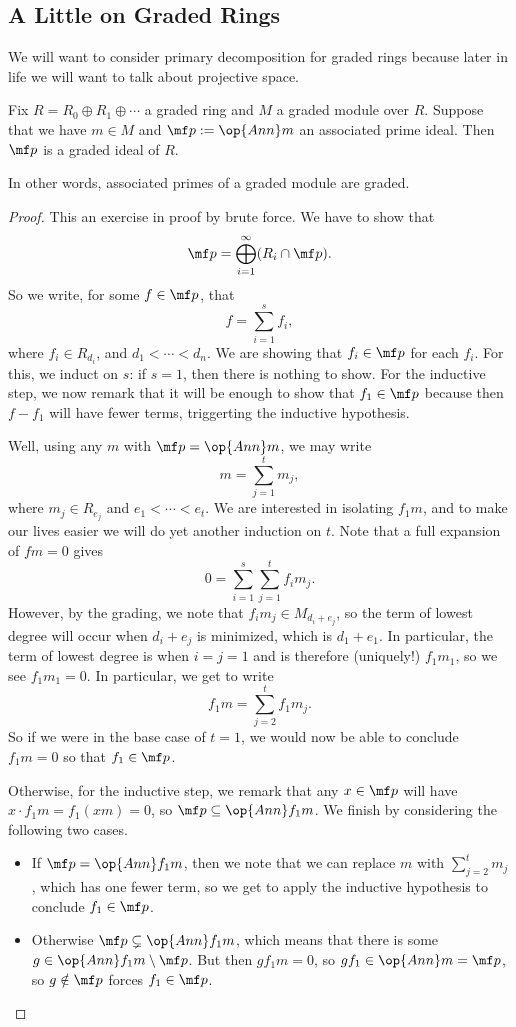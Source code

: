 \subsection{A Little on Graded Rings}
We will want to consider primary decomposition for graded rings because later in life we will want to talk about projective space.
\begin{proposition}
	Fix $R=R_0\oplus R_1\oplus\cdots$ a graded ring and $M$ a graded module over $R$. Suppose that we have $m\in M$ and $\mf p:=\op{Ann}m$ an associated prime ideal. Then $\mf p$ is a graded ideal of $R$.
\end{proposition}
In other words, associated primes of a graded module are graded.
\begin{proof}
	This an exercise in proof by brute force. We have to show that
	\[\mf p=\bigoplus_{i=1}^\infty(R_i\cap\mf p).\]
	So we write, for some $f\in\mf p$, that
	\[f=\sum_{i=1}^sf_i,\]
	where $f_i\in R_{d_i}$, and $d_1<\cdots<d_n$. We are showing that $f_i\in\mf p$ for each $f_i$. For this, we induct on $s$: if $s=1$, then there is nothing to show. For the inductive step, we now remark that it will be enough to show that $f_1\in\mf p$ because then $f-f_1$ will have fewer terms, triggerting the inductive hypothesis.
	
	Well, using any $m$ with $\mf p=\op{Ann}m$, we may write
	\[m=\sum_{j=1}^tm_j,\]
	where $m_j\in R_{e_j}$ and $e_1<\cdots<e_t$. We are interested in isolating $f_1m$, and to make our lives easier we will do yet another induction on $t$. Note that a full expansion of $fm=0$ gives
	\[0=\sum_{i=1}^s\sum_{j=1}^tf_im_j.\]
	However, by the grading, we note that $f_im_j\in M_{d_i+e_j}$, so the term of lowest degree will occur when $d_i+e_j$ is minimized, which is $d_1+e_1$. In particular, the term of lowest degree is when $i=j=1$ and is therefore (uniquely!) $f_1m_1$, so we see $f_1m_1=0$. In particular, we get to write
	\[f_1m=\sum_{j=2}^tf_1m_j.\]
	So if we were in the base case of $t=1$, we would now be able to conclude $f_1m=0$ so that $f_1\in\mf p$.
	
	Otherwise, for the inductive step, we remark that any $x\in\mf p$ will have $x\cdot f_1m=f_1(xm)=0$, so $\mf p\subseteq\op{Ann}f_1m$. We finish by considering the following two cases.
	\begin{itemize}
		\item If $\mf p=\op{Ann}f_1m$, then we note that we can replace $m$ with $\sum_{j=2}^tm_j$, which has one fewer term, so we get to apply the inductive hypothesis to conclude $f_1\in\mf p$.
		\item Otherwise $\mf p\subsetneq\op{Ann}f_1m$, which means that there is some $g\in\op{Ann}f_1m\setminus\mf p$. But then $gf_1m=0$, so $gf_1\in\op{Ann}m=\mf p$, so $g\notin\mf p$ forces $f_1\in\mf p$.
		\qedhere
	\end{itemize}
\end{proof}